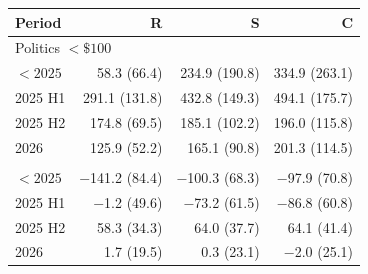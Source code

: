 \begin{tabular}{lrrr}
\toprule
Period & R & S & C \\
\midrule
\multicolumn{4}{l}{Politics $<\$100$} \\
$<2025$ & 58.3 (66.4) & 234.9 (190.8) & 334.9 (263.1) \\
2025 H1 & 291.1 (131.8) & 432.8 (149.3) & 494.1 (175.7) \\
2025 H2 & 174.8 (69.5) & 185.1 (102.2) & 196.0 (115.8) \\
2026 & 125.9 (52.2) & 165.1 (90.8) & 201.3 (114.5) \\
\addlinespace
\multicolumn{4}{l}{Crypto $<\$100$} \\
$<2025$ & \ensuremath{-}141.2 (84.4) & \ensuremath{-}100.3 (68.3) & \ensuremath{-}97.9 (70.8) \\
2025 H1 & \ensuremath{-}1.2 (49.6) & \ensuremath{-}73.2 (61.5) & \ensuremath{-}86.8 (60.8) \\
2025 H2 & 58.3 (34.3) & 64.0 (37.7) & 64.1 (41.4) \\
2026 & 1.7 (19.5) & 0.3 (23.1) & \ensuremath{-}2.0 (25.1) \\
\bottomrule
\end{tabular}
